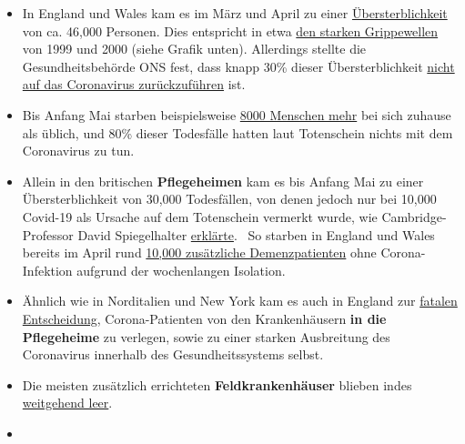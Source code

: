 \begin{itemize}
\tightlist
\item
  In England und Wales kam es im März und April zu einer
  \href{https://www.ons.gov.uk/peoplepopulationandcommunity/birthsdeathsandmarriages/deaths/articles/analysisofdeathregistrationsnotinvolvingcoronaviruscovid19englandandwales28december2019to1may2020/technicalannex}{Übersterblichkeit}
  von ca. 46,000 Personen. Dies entspricht in etwa
  \href{https://off-guardian.org/2020/05/25/were-all-in-the-big-numbers-now/}{den
  starken Grippewellen} von 1999 und 2000 (siehe Grafik unten).
  Allerdings stellte die Gesundheitsbehörde ONS fest, dass knapp 30\%
  dieser Übersterblichkeit
  \href{https://www.ons.gov.uk/peoplepopulationandcommunity/birthsdeathsandmarriages/deaths/articles/analysisofdeathregistrationsnotinvolvingcoronaviruscovid19englandandwales28december2019to1may2020/technicalannex}{nicht
  auf das Coronavirus zurückzuführen} ist.
\item
  Bis Anfang Mai starben beispielsweise
  \href{https://www.theguardian.com/society/2020/may/08/more-people-dying-at-home-during-covid-19-pandemic-uk-analysis}{8000
  Menschen mehr} bei sich zuhause als üblich, und 80\% dieser Todesfälle
  hatten laut Totenschein nichts mit dem Coronavirus zu tun.
\item
  Allein in den britischen \textbf{Pflegeheimen} kam es bis Anfang Mai
  zu einer Übersterblichkeit von 30,000 Todesfällen, von denen jedoch
  nur bei 10,000 Covid-19 als Ursache auf dem Totenschein vermerkt
  wurde, wie Cambridge-Professor David Spiegelhalter
  \href{https://www.bmj.com/content/369/bmj.m1931}{erklärte}.~ So
  starben in England und Wales bereits im April rund
  \href{https://www.theguardian.com/world/2020/jun/05/covid-19-causing-10000-dementia-deaths-beyond-infections-research-says}{10,000
  zusätzliche Demenzpatienten} ohne Corona-Infektion aufgrund der
  wochenlangen Isolation.
\item
  Ähnlich wie in Norditalien und New York kam es auch in England zur
  \href{https://drmalcolmkendrick.org/2020/05/11/how-to-make-a-crisis-far-far-worse/}{fatalen
  Entscheidung}, Corona-Patienten von den Krankenhäusern \textbf{in die
  Pflegeheime} zu verlegen, sowie zu einer starken Ausbreitung des
  Coronavirus innerhalb des Gesundheitssystems selbst.
\item
  Die meisten zusätzlich errichteten \textbf{Feldkrankenhäuser} blieben
  indes
  \href{https://www.telegraph.co.uk/news/0/do-many-nhs-nightingale-hospitals-remain-empty/}{weitgehend
  leer}.
\item

\end{itemize}
